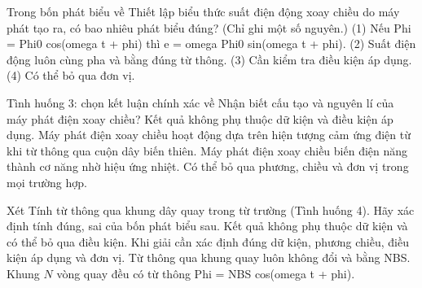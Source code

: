 \begin{ex}
Trong bốn phát biểu về Thiết lập biểu thức suất điện động xoay chiều do máy phát tạo ra, có bao nhiêu phát biểu đúng? (Chỉ ghi một số nguyên.) (1) Nếu Phi = Phi0 cos(omega t + phi) thì e = omega Phi0 sin(omega t + phi). (2) Suất điện động luôn cùng pha và bằng đúng từ thông. (3) Cần kiểm tra điều kiện áp dụng. (4) Có thể bỏ qua đơn vị.
\end{ex}

\begin{ex}
Tình huống 3: chọn kết luận chính xác về Nhận biết cấu tạo và nguyên lí của máy phát điện xoay chiều?
\choice
{Kết quả không phụ thuộc dữ kiện và điều kiện áp dụng.}
{\True Máy phát điện xoay chiều hoạt động dựa trên hiện tượng cảm ứng điện từ khi từ thông qua cuộn dây biến thiên.}
{Máy phát điện xoay chiều biến điện năng thành cơ năng nhờ hiệu ứng nhiệt.}
{Có thể bỏ qua phương, chiều và đơn vị trong mọi trường hợp.}
\end{ex}

\begin{ex}
Xét Tính từ thông qua khung dây quay trong từ trường (Tình huống 4). Hãy xác định tính đúng, sai của bốn phát biểu sau.
\choiceTF
{Kết quả không phụ thuộc dữ kiện và có thể bỏ qua điều kiện.}
{\True Khi giải cần xác định đúng dữ kiện, phương chiều, điều kiện áp dụng và đơn vị.}
{Từ thông qua khung quay luôn không đổi và bằng NBS.}
{\True Khung $N$ vòng quay đều có từ thông Phi = NBS cos(omega t + phi).}
\end{ex}

